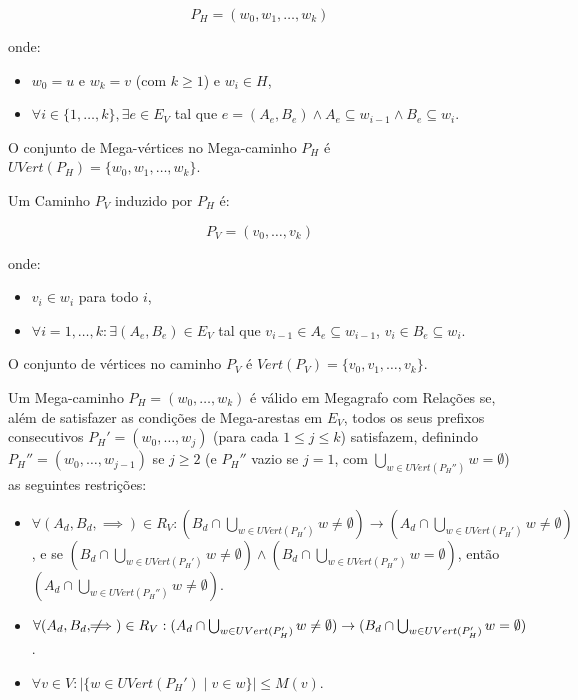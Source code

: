 \documentclass{article}
\begin{document}
\[ P_H = (w_0, w_1, \dots, w_k) \]

onde:

\begin{itemize}
    \item \( w_0 = u \) e \( w_k = v \) (com \( k \geq 1 \)) e \( w_i \in H \),
    \item \( \forall i \in \{1, \dots, k\}, \exists e \in E_V \) tal que \( e = (A_e, B_e) \wedge A_e \subseteq w_{i-1} \wedge B_e \subseteq w_i \).
\end{itemize}

O conjunto de Mega-vértices no Mega-caminho \( P_H \) é \( UVert(P_H) = \{ w_0, w_1, \dots, w_k \} \).

Um Caminho \( P_V \) induzido por \( P_H \) é:

\[ P_V = (v_0, \dots, v_k) \]

onde:

\begin{itemize}
    \item \( v_i \in w_i \) para todo \( i \),
    \item \( \forall i = 1, \dots, k: \exists (A_e, B_e) \in E_V \) tal que \( v_{i-1} \in A_e \subseteq w_{i-1} \), \( v_i \in B_e \subseteq w_i \).
\end{itemize}

O conjunto de vértices no caminho \( P_V \) é \( Vert(P_V) = \{ v_0, v_1, \dots, v_k \} \).
\newpage

Um Mega-caminho \( P_H = (w_0, \dots, w_k) \) é válido em Megagrafo com Relações se, além de satisfazer as condições de Mega-arestas em \( E_V \), todos os seus prefixos consecutivos \( P_H' = (w_0, \dots, w_j) \) (para cada \( 1 \leq j \leq k \)) satisfazem, definindo \( P_H'' = (w_0, \dots, w_{j-1}) \) se \( j \geq 2 \) (e \( P_H'' \) vazio se \( j = 1 \), com \( \bigcup_{w \in UVert(P_H'')} w = \emptyset \))  as seguintes restrições:

\begin{itemize}
    \item \( \forall (A_d, B_d, \implies) \in R_V: (B_d \cap \bigcup_{w \in UVert(P_H')} w \neq \emptyset) \to (A_d \cap \bigcup_{w \in UVert(P_H')} w \neq \emptyset) \), e se \( (B_d \cap \bigcup_{w \in UVert(P_H')} w \neq \emptyset) \wedge (B_d \cap \bigcup_{w \in UVert(P_H'')} w = \emptyset) \), então \( (A_d \cap \bigcup_{w \in UVert(P_H'')} w \neq \emptyset) \).
    \item \( \forall (A_d, B_d, \not\!\!\!\implies) \in R_V: (A_d \cap \bigcup_{w \in UVert(P_H')} w \neq \emptyset) \to (B_d \cap \bigcup_{w \in UVert(P_H')} w = \emptyset) \).
    \item \( \forall v \in V: |\{ w \in UVert(P_H') \mid v \in w \}| \leq M(v) \).
\end{itemize}
\end{document}
